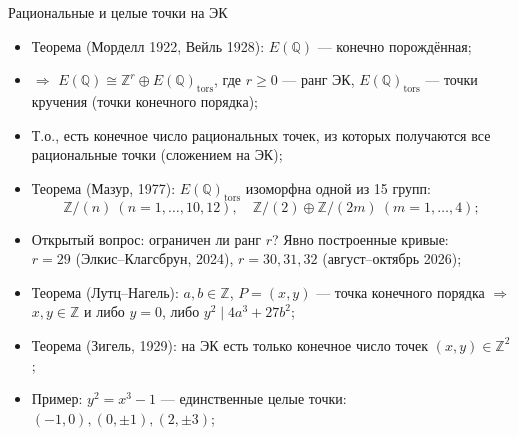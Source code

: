 \documentclass[serif, aspectratio=169]{beamer}
\newcommand{\sagemark}{%
  \textcolor{green!40!black}{\textbf{\texttt{sage:...}}}%
}
\begin{document}
\begin{frame}{Рациональные и целые точки на ЭК}
    \begin{itemize}
        \item Теорема (Морделл 1922, Вейль 1928): $E(\mathbb{Q})$ --- конечно порождённая;
        \item $\Rightarrow$ $E(\mathbb{Q})\cong\mathbb{Z}^r\oplus E(\mathbb{Q})_{\mathrm{tors}}$, где $r\ge0$ --- ранг ЭК, $E(\mathbb{Q})_{\mathrm{tors}}$ --- точки кручения (точки конечного порядка);
        \item Т.о., есть конечное число рациональных точек, из которых получаются все рациональные точки (сложением на ЭК);
        \item Теорема (Мазур, 1977): $E(\mathbb{Q})_{\mathrm{tors}}$ изоморфна одной из 15 групп:
        \[\mathbb{Z}/(n)\ (n=1,\dots,10,12),\quad \mathbb{Z}/(2)\oplus\mathbb{Z}/(2m)\ (m=1,\dots,4);\]
        \item Открытый вопрос: ограничен ли ранг $r$? Явно построенные кривые:\\ $r=29$ (Элкис--Клагсбрун, 2024), $r=30,31,32$ (август--октябрь 2026);
        \item Теорема (Лутц--Нагель): $a,b\in\mathbb{Z}$, $P=(x,y)$ --- точка конечного порядка $\Rightarrow$ $x,y\in\mathbb{Z}$ и либо $y=0$, либо $y^2\mid 4a^3+27b^2$;
        \item Теорема (Зигель, 1929): на ЭК есть только конечное число точек $(x,y)\in\mathbb{Z}^2$;
        \item Пример: $y^2=x^3-1$ --- единственные целые точки: $(-1,0),(0,\pm1),(2,\pm3)$;
    \end{itemize}
\end{frame}
\end{document}
